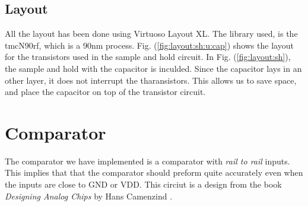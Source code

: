 \documentclass[english, 12pt, a4paper]{ifimaster}
\begin{document}
\subsection{Layout}
All the layout has been done using Virtuoso Layout XL. The library used, is the
tmcN90rf, which is a 90nm process. Fig. (\ref{fig:layout:sh:u:cap}) shows
the layout for the transistors used in the sample and hold circuit. In 
Fig. (\ref{fig:layout:sh}), the sample and hold with the capacitor is inculded. 
Since the capacitor lays in an other layer, it does not interrupt the tharansistors. 
This allows us to save space, and place the capacitor on top of the transistor circuit.

% 




\section{Comparator}
The comparator we have implemented is a comparator with \textit{rail to rail} inputs. This implies that that the comparator should preform quite accurately even when the inputs are close to 
GND or VDD. This circiut is a design from the book \textit{Designing Analog Chips} by Hans Camenzind \cite{hansc}.
\end{document}
